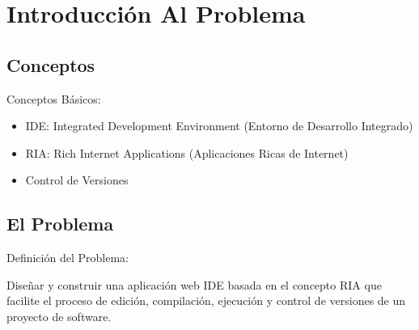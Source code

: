 \section{Introducción Al Problema}


\subsection{Conceptos}

\begin{frame}{Conceptos Básicos:\newline}

\begin{itemize}
	
	\item IDE: Integrated Development Environment (Entorno de Desarrollo Integrado)
	\pause
	
	\item RIA: Rich Internet Applications (Aplicaciones Ricas de Internet)
	\pause
	
	\item Control de Versiones
	
\end{itemize}

\end{frame}


\subsection{El Problema}

\begin{frame}{Definición del Problema:\newline}

Diseñar y construir una aplicación web IDE basada en el concepto RIA que facilite el proceso de edición, compilación, ejecución y control de versiones de un proyecto de software.

\end{frame}
